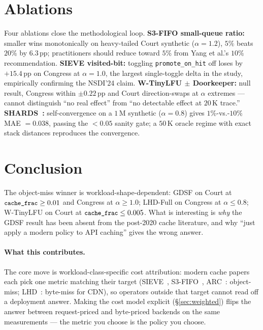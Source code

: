 \documentclass[letterpaper,twocolumn,10pt]{article}
\newcommand{\code}[1]{\texttt{\small #1}}
\begin{document}
\section{Ablations}\label{sec:ablations}

Four ablations close the methodological loop. \textbf{S3-FIFO
small-queue ratio:} smaller wins monotonically on heavy-tailed Court
synthetic ($\alpha=1.2$), $5\%$ beats $20\%$ by $6.3$\,pp;
practitioners should reduce toward $5\%$ from Yang et al.'s $10\%$
recommendation. \textbf{SIEVE visited-bit:} toggling
\texttt{promote\_on\_hit} off loses by $+15.4$\,pp on Congress at
$\alpha=1.0$, the largest single-toggle delta in the study,
empirically confirming the NSDI'24 claim. \textbf{W-TinyLFU $\pm$
Doorkeeper:} null result, Congress within $\pm 0.22$\,pp and Court
direction-swaps at $\alpha$ extremes — cannot distinguish ``no real
effect'' from ``no detectable effect at $20$\,K trace.''
\textbf{SHARDS~\cite{waldspurger2015shards}:} self-convergence on a
$1$\,M synthetic ($\alpha=0.8$) gives $1\%$-vs.-$10\%$ MAE $=0.038$,
passing the $<0.05$ sanity gate; a $50$\,K oracle regime with exact
stack distances reproduces the convergence.

\section{Conclusion}\label{sec:conclusion}

The object-miss winner is workload-shape-dependent: GDSF on Court at
$\code{cache\_frac} \geq 0.01$ and Congress at $\alpha \geq 1.0$;
LHD-Full on Congress at $\alpha \leq 0.8$; W-TinyLFU on Court at
$\code{cache\_frac} \leq 0.005$. What is interesting is \emph{why}
the GDSF result has been absent from the post-2020 cache literature,
and why ``just apply a modern policy to API caching'' gives the
wrong answer.

\paragraph{What this contributes.} The core move is
workload-class-specific cost attribution: modern cache papers each
pick one metric matching their target
(SIEVE~\cite{zhang2024sieve}, S3-FIFO~\cite{yang2023fifo},
ARC~\cite{megiddo2003arc}: object-miss; LHD~\cite{beckmann2018lhd}:
byte-miss for CDN), so operators outside that target cannot read off
a deployment answer. Making the cost model explicit
(\S\ref{sec:weighted}) flips the answer between request-priced and
byte-priced backends on the same measurements — the metric you
choose is the policy you choose.
\end{document}
